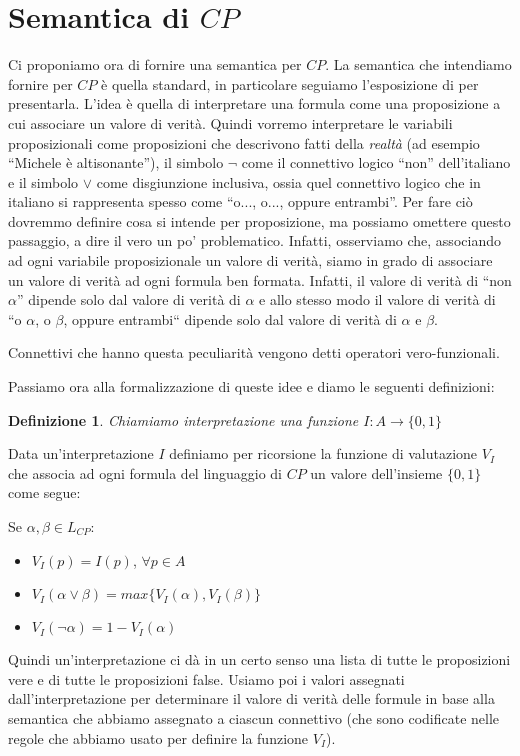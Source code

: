 \documentclass[a4paper, titlepage, 12pt]{report}
\newtheorem{definition}{Definizione}[chapter]
\begin{document}
\section{Semantica di $CP$}
Ci proponiamo ora di fornire una semantica per $CP$.
La semantica che intendiamo fornire per $CP$ è quella standard, in particolare
seguiamo l'esposizione di \cite{Tortora} per presentarla.
L'idea è quella di interpretare una formula come una proposizione
a cui associare un valore di verità. Quindi vorremo interpretare
le variabili proposizionali come proposizioni
che descrivono fatti della \emph{realtà} (ad esempio ``Michele è altisonante''),
il simbolo $\neg$ come il connettivo logico ``non'' dell'italiano
e il simbolo $\lor$ come disgiunzione inclusiva, ossia quel connettivo
logico che in italiano si rappresenta spesso come ``o..., o..., oppure entrambi''.
Per fare ciò dovremmo definire cosa si intende per proposizione,
ma possiamo omettere questo passaggio, a dire il vero un po' problematico.
Infatti, osserviamo che, associando ad ogni variabile proposizionale un valore di verità,
siamo in grado di associare un valore di verità ad ogni formula ben formata.
Infatti, il valore di verità di ``non $\alpha$'' dipende solo dal valore di verità
di $\alpha$ e allo stesso modo il valore di verità di
``o $\alpha$, o $\beta$, oppure entrambi``
dipende solo dal valore di verità di $\alpha$ e $\beta$.

Connettivi che hanno questa peculiarità vengono detti operatori vero-funzionali.

Passiamo ora alla formalizzazione di queste idee e diamo le seguenti definizioni:

\begin{definition}
Chiamiamo interpretazione una funzione $I: A \to \{0, 1\}$
\end{definition}

Data un'interpretazione $I$ definiamo per ricorsione la funzione di valutazione $V_I$ che associa ad ogni formula
del linguaggio di $CP$ un valore dell'insieme $\{0, 1\}$ come segue:

Se $\alpha, \beta \in L_{CP}$:
\begin{itemize}
\item $V_I(p) = I(p)$, $\forall p \in A$
\item $V_I(\alpha \lor \beta) = max\{V_I(\alpha), V_I(\beta)\}$
\item $V_I(\neg \alpha) = 1 - V_I(\alpha)$
\end{itemize}


Quindi un'interpretazione ci dà in un certo senso una lista di tutte le proposizioni
vere e di tutte le proposizioni false.
Usiamo poi i valori assegnati dall'interpretazione per determinare il valore di verità delle formule
in base alla semantica che abbiamo assegnato a ciascun connettivo (che sono codificate nelle regole
che abbiamo usato per definire la funzione $V_I$).
\end{document}
